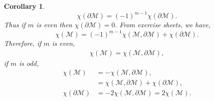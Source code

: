 \documentclass[8pt]{article}
\newtheorem{corollary}{Corollary} [section]
\newcommand{\M}[0]{\mathcal{M}}
\begin{document}
\begin{corollary}
  \begin{equation*}
    \chi(\partial\M) = (-1)^{m-1}\chi(\partial\M). 
  \end{equation*}
  Thus if $m$ is even then $\chi(\partial\M)=0$. From exercise sheets, we have,
  \begin{equation*}
    \chi(\M)=(-1)^{m-1}\chi(\M,\partial\M)+\chi(\partial\M).
  \end{equation*}
  Therefore, if $m$ is even,
  \begin{align*}
      \chi(\M)=\chi(\M,\partial\M),
  \end{align*}
  if $m$ is odd, 
  \begin{align*}
    \chi(\M)&=-\chi(\M,\partial\M),\\
    & = \chi(\M,\partial\M)+\chi(\partial\M),\\
    \chi(\partial\M)&=-2\chi(\M,\partial\M)=2\chi(\M).
  \end{align*}
\end{corollary}
\end{document}
